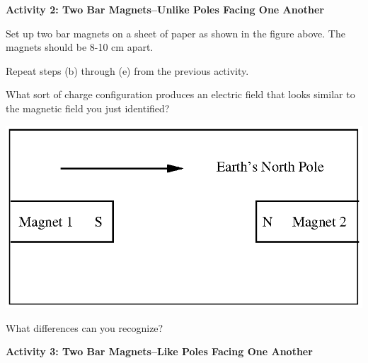 \textbf{Activity 2: Two Bar Magnets--Unlike Poles Facing One Another}

\begin{enumerate}[labparts]
\begin{minipage}{0.49\textwidth}
\item Set up two bar magnets on a sheet of paper as shown in the figure
above. The magnets should be 8-10 cm apart.
\item Repeat steps (b) through (e) from the previous activity.
\item What sort of charge configuration produces an electric field that
looks similar to the magnetic field you just identified?
\end{minipage}
\begin{minipage}{0.45\textwidth}
\hspace{0.25in}\includegraphics[width=\textwidth]{magnetism_field_perm_mag/magnetism_2_fig_2.eps}
\end{minipage}
\answerspace{30mm}

\item What differences can you recognize?
\answerspace{30mm}
\end{enumerate}

\textbf{Activity 3: Two Bar Magnets--Like Poles Facing One Another}

